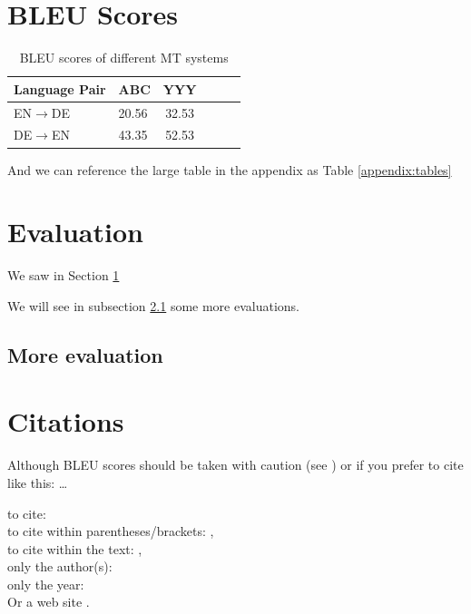 \documentclass[../CLthesis.tex]{subfiles}
\begin{document}
\section{BLEU Scores}%
\label{sec:bleuscores}


\begin{table}[tbp]
	\centering
	\begin{tabular}{ll|ccr|r}
		\textbf{Language Pair}     & \textbf{ABC}   & \textbf{YYY}   \\
		\midrule
		EN$\rightarrow$DE & 20.56 & 32.53 \\
		DE$\rightarrow$EN & 43.35 & 52.53 \\
		\bottomrule
	\end{tabular}
	\caption[ABC BLEU scores]{BLEU scores of different MT systems}%
	\label{tab:bleuresults}
\end{table}

And we can reference the large table in the appendix as Table \ref{appendix:tables}

\section{Evaluation}%
\label{sec:evaluation}
We saw in Section \ref{sec:bleuscores}

We will see in subsection \ref{subsec:moreeval} some more evaluations.

\subsection{More evaluation}%
\label{subsec:moreeval}


\section{Citations}
Although BLEU scores should be taken with caution (see \citet{Callison-Burch2006})
or if you prefer to cite like this: \citep{Callison-Burch2006} \ldots

to cite: \cite[30-31]{Koehn2005} \\
to cite within parentheses/brackets: \citep{Koehn2005}, \citep[30-32]{Koehn2005}\\

to cite within the text: \citet{Koehn2005}, \citet[37]{Koehn2005}\\
only the author(s): \citeauthor{Callison-Burch2006}\\
only the year: \citeyear{Callison-Burch2006}\\
Or a web site \cite{Melby:2001}.
\end{document}
